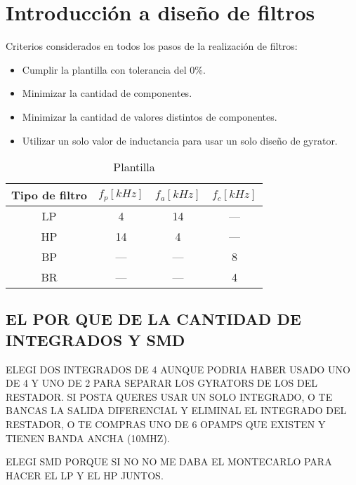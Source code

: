 \documentclass[../../tc_tp3_main.tex]{subfiles}
\begin{document}
\chapter{Introducci\'on a dise\~no de filtros}


Criterios considerados en todos los pasos de la realizaci\'on de filtros:

\begin{itemize}
	\item Cumplir la plantilla con tolerancia del 0\%.
	\item Minimizar la cantidad de componentes. 
	\item Minimizar la cantidad de valores distintos de componentes.
	\item Utilizar un solo valor de inductancia para usar un solo dise\~no de gyrator.
\end{itemize}




\begin{table}[htbp]
\centering
\begin{tabular}{|c|c|c|c|}
\hline 
Tipo de filtro & $f_p[kHz]$ & $f_a[kHz]$ & $f_c[kHz]$ \\ 
\hline 
LP & 4   & 14  & --- \\ 
\hline 
HP & 14  & 4   & --- \\ 
\hline 
BP & --- & --- & 8   \\ 
\hline 
BR & --- & --- & 4   \\ 
\hline 
\end{tabular}
\label{tab:ej2_plantilla} 
\caption{Plantilla}
\end{table}









\section{EL POR QUE DE LA CANTIDAD DE INTEGRADOS Y SMD}

ELEGI DOS INTEGRADOS DE 4 AUNQUE PODRIA HABER USADO UNO DE 4 Y UNO DE 2 PARA SEPARAR LOS GYRATORS DE LOS DEL RESTADOR. SI POSTA QUERES USAR UN SOLO INTEGRADO, O TE BANCAS LA SALIDA DIFERENCIAL Y ELIMINAL EL INTEGRADO DEL RESTADOR, O TE COMPRAS UNO DE 6 OPAMPS QUE EXISTEN Y TIENEN BANDA ANCHA (10MHZ).

ELEGI SMD PORQUE SI NO NO ME DABA EL MONTECARLO PARA HACER EL LP Y EL HP JUNTOS.
\end{document}
